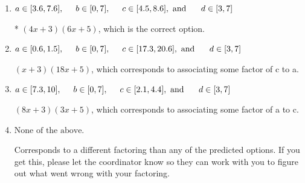 \documentclass{extbook}[14pt]
\begin{document}
\begin{enumerate}
{\begin{enumerate}[label=\Alph*.]
 $(x + 18)(x + 20)$, which corresponds to factoring $x^{2} +38 x + 360$.
\item \( a \in [3.6, 7.6], \hspace*{5mm} b \in [0, 7], \hspace*{5mm} c \in [4.5, 8.6], \text{ and } \hspace*{5mm} d \in [3, 7] \)

* $(4x + 3)(6x + 5)$, which is the correct option.
\item \( a \in [0.6, 1.5], \hspace*{5mm} b \in [0, 7], \hspace*{5mm} c \in [17.3, 20.6], \text{ and } \hspace*{5mm} d \in [3, 7] \)

 $(x + 3)(18x + 5)$, which corresponds to associating some factor of c to a.
\item \( a \in [7.3, 10], \hspace*{5mm} b \in [0, 7], \hspace*{5mm} c \in [2.1, 4.4], \text{ and } \hspace*{5mm} d \in [3, 7] \)

 $(8x + 3)(3x + 5)$, which corresponds to associating some factor of a to c.
\item \( \text{None of the above.} \)

 Corresponds to a different factoring than any of the predicted options. If you get this, please let the coordinator know so they can work with you to figure out what went wrong with your factoring.
\end{enumerate}

}
\end{enumerate}
\end{document}
